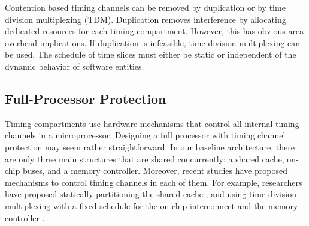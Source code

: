 Contention based timing channels can be removed by duplication or by
time division multiplexing (TDM). Duplication removes interference by
allocating dedicated resources for each timing compartment.
However, this has obvious area overhead implications. If 
duplication is infeasible, time division multiplexing can be used.
The schedule of time slices must either be static or independent of the 
dynamic behavior of software entities.

%


\subsection{Full-Processor Protection}

Timing compartments use hardware mechanisms that control all internal timing 
channels in a microprocessor. Designing a full processor with timing channel
protection may seem rather straightforward. In our baseline architecture, there are
only three main structures that are shared concurrently: a shared cache, on-chip
buses, and a memory controller. Moreover, recent studies have proposed mechanisms
to control timing channels in each of them. For example, researchers have proposed
statically partitioning the shared cache \cite{percival}, and using time division 
multiplexing with a fixed schedule for the on-chip interconnect 
\cite{yaonocs, surfnoc} and the memory controller \cite{ushpca14}.

